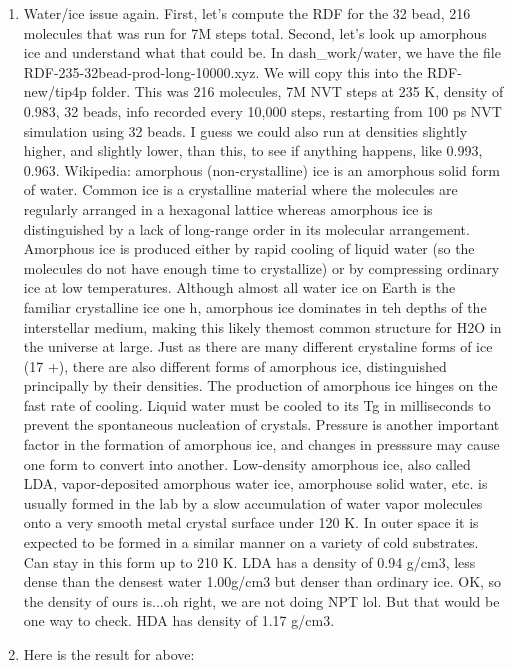\documentclass[12pt,reqno]{amsart}
\numberwithin{equation}{section}
\begin{document}
\begin{enumerate}
\item Water/ice issue again.  First, let's compute the RDF for the 32 bead, 216 molecules that was run for 7M steps total.  Second, let's look up amorphous ice and understand what that could be.  In dash\_work/water, we have the file RDF-235-32bead-prod-long-10000.xyz.  We will copy this into the RDF-new/tip4p folder.  This was 216 molecules, 7M NVT steps at 235 K, density of 0.983, 32 beads, info recorded every 10,000 steps, restarting from 100 ps NVT simulation using 32 beads.  I guess we could also run at densities slightly higher, and slightly lower, than this, to see if anything happens, like 0.993, 0.963.  Wikipedia: amorphous (non-crystalline) ice is an amorphous solid form of water.  Common ice is a crystalline material where the molecules are regularly arranged in a hexagonal lattice whereas amorphous ice is distinguished by a lack of long-range order in its molecular arrangement.  Amorphous ice is produced either by rapid cooling of liquid water (so the molecules do not have enough time to crystallize) or by compressing ordinary ice at low temperatures.  Although almost all water ice on Earth is the familiar crystalline ice one h, amorphous ice dominates in teh depths of the interstellar medium, making this likely themost common structure for H2O in the universe at large.  Just as there are many different crystaline forms of ice (17 +), there are also different forms of amorphous ice, distinguished principally by their densities.  The production of amorphous ice hinges on the fast rate of cooling.  Liquid water must be cooled to its Tg in milliseconds to prevent the spontaneous nucleation of crystals.  Pressure is another important factor in the formation of amorphous ice, and changes in presssure may cause one form to convert into another.  Low-density amorphous ice, also called LDA, vapor-deposited amorphous water ice, amorphouse solid water, etc. is usually formed in the lab by a slow accumulation of water vapor molecules onto a very smooth metal crystal surface under 120 K.  In outer space it is expected to be formed in a similar manner on a variety of cold substrates.  Can stay in this form up to 210 K.  LDA has a density of 0.94 g/cm3, less dense than the densest water 1.00g/cm3 but denser than ordinary ice.  OK, so the density of ours is...oh right, we are not doing NPT lol.  But that would be one way to check.  HDA has density of 1.17 g/cm3.  
\item Here is the result for above:


\end{enumerate}
\end{document}
